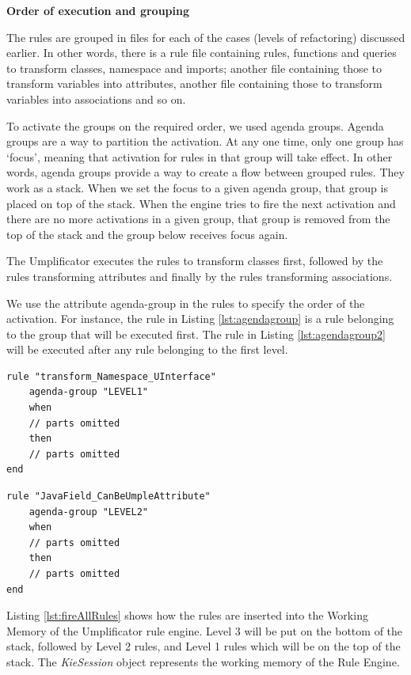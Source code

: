 \textbf{Order of execution and grouping}

The rules are grouped in files for each of the cases (levels of refactoring) discussed earlier. In other words, there is a rule file containing rules, functions and queries to transform classes, namespace and imports; another file containing those to transform variables into attributes, another file containing those to transform variables into associations and so on.

To activate the groups on the required order, we used agenda groups. Agenda groups are a way to partition the activation. At any one time, only one group has `focus', meaning that activation for rules in that group will take effect. 
In other words, agenda groups provide a way to create a flow between grouped rules. They work as a stack. When we set the focus to a given agenda group, that group is placed on top of the stack. When the engine tries to fire the next activation and there are no more activations in a given group, that group is removed from the top of the stack and the group below receives focus again.

The Umplificator executes the rules to transform classes first, followed by the rules transforming attributes and finally by the rules transforming associations. 

We use the attribute agenda-group in the rules to specify the order of the activation. For instance, the rule in Listing \ref{lst:agendagroup} is a rule belonging to the group that will be executed first. The rule in Listing \ref{lst:agendagroup2} will be executed after any rule belonging to the first level. 

\begin{lstlisting}[language={drools},label={lst:agendagroup}, caption=A rule belonging to Level 1] 
rule "transform_Namespace_UInterface"
	agenda-group "LEVEL1" 
	when
	// parts omitted
	then
	// parts omitted
end
\end{lstlisting}

\begin{lstlisting}[language={drools},label={lst:agendagroup2}, caption=A rule belonging to Level 2] 
rule "JavaField_CanBeUmpleAttribute"
	agenda-group "LEVEL2" 
	when
	// parts omitted
	then
	// parts omitted
end
\end{lstlisting}

Listing \ref{lst:fireAllRules} shows how the rules are inserted into the Working Memory of the Umplificator rule engine. Level 3 will be put on the bottom of the stack, followed by Level 2 rules, and Level 1 rules which will be on the top of the stack. The \textit{KieSession} object represents the working memory of the Rule Engine.

